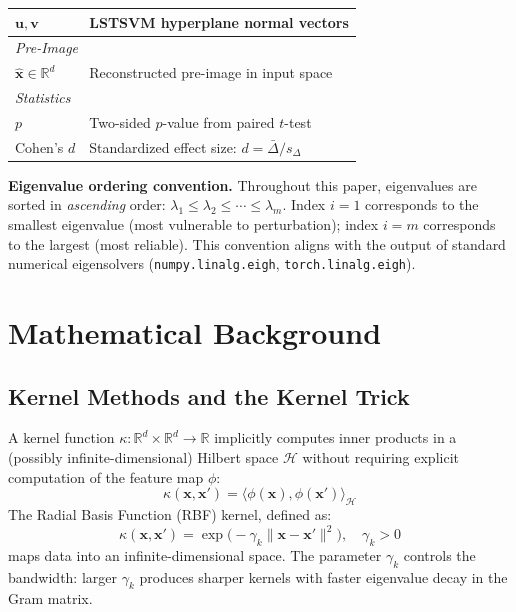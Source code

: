 \documentclass[preprint,review,12pt]{elsarticle}
\begin{document}
\begin{table}[!t]
\begin{tabular}{@{}p{1.4cm}p{6.2cm}@{}}
$\bm{u}, \bm{v}$ & LSTSVM hyperplane normal vectors \\
\midrule
\multicolumn{2}{l}{\textit{Pre-Image}} \\
$\hat{\bm{x}} \in \mathbb{R}^d$ & Reconstructed pre-image in input space \\
\midrule
\multicolumn{2}{l}{\textit{Statistics}} \\
$p$ & Two-sided $p$-value from paired $t$-test \\
Cohen's $d$ & Standardized effect size: $d = \bar{\Delta} / s_\Delta$ \\
\bottomrule
\end{tabular}
\end{table}

\textbf{Eigenvalue ordering convention.} Throughout this paper, eigenvalues are sorted in \emph{ascending} order: $\lambda_1 \leq \lambda_2 \leq \cdots \leq \lambda_m$. Index $i{=}1$ corresponds to the smallest eigenvalue (most vulnerable to perturbation); index $i{=}m$ corresponds to the largest (most reliable). This convention aligns with the output of standard numerical eigensolvers (\texttt{numpy.linalg.eigh}, \texttt{torch.linalg.eigh}).



\section{Mathematical Background}
\label{sec:background}

\subsection{Kernel Methods and the Kernel Trick}

A kernel function $\kappa: \mathbb{R}^d \times \mathbb{R}^d \to \mathbb{R}$ implicitly computes inner products in a (possibly infinite-dimensional) Hilbert space $\mathcal{H}$ without requiring explicit computation of the feature map $\phi$:
\begin{equation}
\kappa(\bm{x}, \bm{x}') = \langle \phi(\bm{x}), \phi(\bm{x}') \rangle_\mathcal{H}
\end{equation}
The Radial Basis Function (RBF) kernel, defined as:
\begin{equation}
\kappa(\bm{x}, \bm{x}') = \exp\bigl(-\gamma_k \|\bm{x} - \bm{x}'\|^2\bigr), \quad \gamma_k > 0
\label{eq:rbf_kernel}
\end{equation}
maps data into an infinite-dimensional space. The parameter $\gamma_k$ controls the bandwidth: larger $\gamma_k$ produces sharper kernels with faster eigenvalue decay in the Gram matrix.
\end{document}
